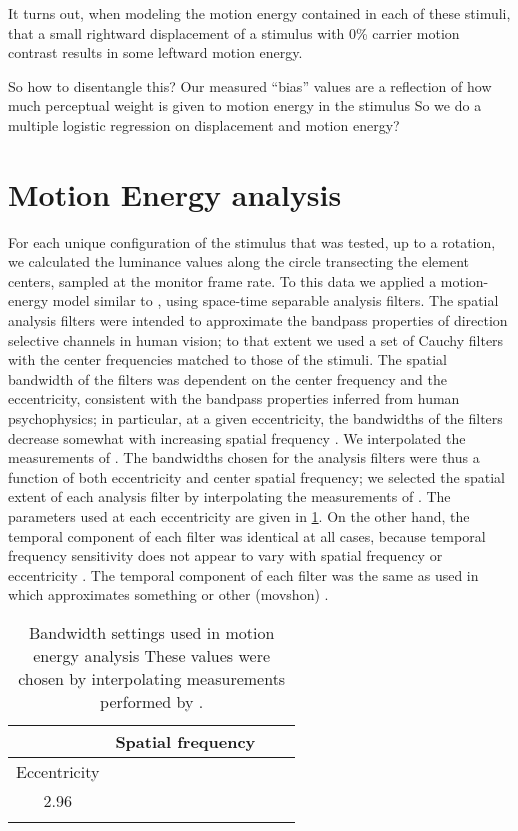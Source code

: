 \documentclass[english,noae]{article}
\providecommand{\tabularnewline}{\\}
\newenvironment{lyxgreyedout}
  {\textcolor{note_fontcolor}\bgroup\ignorespaces}
  {\ignorespacesafterend\egroup}
\begin{document}
It turns out, when modeling the motion energy contained in each of
these stimuli, that a small rightward displacement of a stimulus with
0\% carrier motion contrast results in some leftward motion energy.

So how to disentangle this? Our measured ``bias'' values are a reflection
of how much perceptual weight is given to motion energy in the stimulus
So we do a multiple logistic regression on displacement and motion
energy?


\section{Motion Energy analysis}

For each unique configuration of the stimulus that was tested, up
to a rotation, we calculated the luminance values along the circle
transecting the element centers, sampled at the monitor frame rate.
To this data we applied a motion-energy model similar to \citep{Adelson:1985ea},
using space-time separable analysis filters. The spatial analysis
filters were intended to approximate the bandpass properties of direction
selective channels in human vision; to that extent we used a set of
Cauchy filters \citep{Klein:1985rz} with the center frequencies matched
to those of the stimuli. The spatial bandwidth of the filters was
dependent on the center frequency and the eccentricity, consistent
with the bandpass properties inferred from human psychophysics; in
particular, at a given eccentricity, the bandwidths of the filters
decrease somewhat with increasing spatial frequency \citep{Anderson:1987oq,Banks:1991kl,Anderson:1991hc}.
We interpolated the measurements of \citet{Banks:1991kl}. The bandwidths
chosen for the analysis filters were thus a function of both eccentricity
and center spatial frequency; we selected the spatial extent of each
analysis filter by interpolating the measurements of . The parameters
used at each eccentricity are given in \ref{tab:Bandwidth}. On the
other hand, the temporal component of each filter was identical at
all cases, because temporal frequency sensitivity does not appear
to vary with spatial frequency or eccentricity \citep{Virsu:1982fv,Wright:1983dz}.
The temporal component of each filter was the same as used in \citet{Kiani:2008uq}
which approximates %
\begin{lyxgreyedout}
something or other (movshon)%
\end{lyxgreyedout}
. 

\begin{table}
\begin{tabular}{|c|c|c|c|}
\hline 
 &
Spatial frequency &
 &
\tabularnewline
\hline 
\hline 
Eccentricity &
 &
 &
\tabularnewline
\hline 
2.96 &
 &
 &
\tabularnewline
\hline 
 &
 &
 &
\tabularnewline
\hline 
\end{tabular}

\caption{\label{tab:Bandwidth}Bandwidth settings used in motion energy analysis
These values were chosen by interpolating measurements performed by
.}
\end{table}





\begin{quote}


\end{quote}
\end{document}

